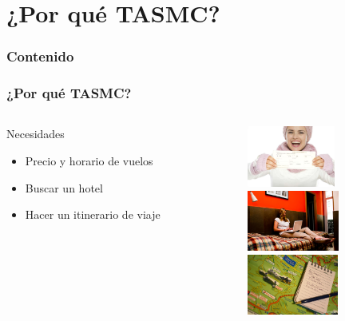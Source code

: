\documentclass[12pt]{beamer}
\begin{document}
\section{¿Por qué TASMC?}
\begin{frame}
\frametitle{Contenido}
\tableofcontents
\end{frame}

\begin{frame}
	\frametitle{¿Por qué TASMC?}
	\begin{columns} 
		\begin{column}{5cm} 
			\begin{block}{Necesidades} \small 
				\begin{itemize}
					\item Precio y horario de vuelos
					\item Buscar un hotel
					\item Hacer un itinerario de viaje
				\end{itemize} 
			\end{block} 
		\end{column}
		\begin{column}{5cm} 
			\begin{center}
				\includegraphics[height=2cm]{imagenes/nvuelo.jpg} \\
				\includegraphics[height=2cm]{imagenes/nhotel.jpg} \\
				\includegraphics[height=2cm]{imagenes/nitinerario.jpg}
			\end{center} 
		\end{column} 
	\end{columns}
\end{frame}
\end{document}
